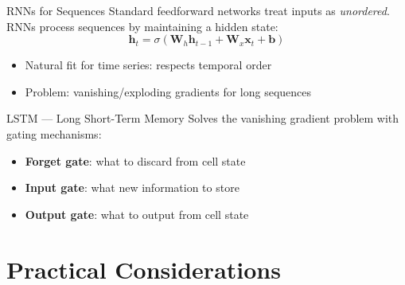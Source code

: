 \documentclass[aspectratio=169, 10pt]{beamer}
\begin{document}
\begin{frame}{RNNs for Sequences}
Standard feedforward networks treat inputs as \emph{unordered}. \\
RNNs process sequences by maintaining a \alert{hidden state}:
\[
\mathbf{h}_t = \sigma(\mathbf{W}_h \mathbf{h}_{t-1} + \mathbf{W}_x \mathbf{x}_t + \mathbf{b})
\]

\begin{itemize}
    \item Natural fit for time series: respects temporal order
    \item \alert{Problem:} vanishing/exploding gradients for long sequences
\end{itemize}
\end{frame}

\begin{frame}{LSTM --- Long Short-Term Memory}
Solves the vanishing gradient problem with \alert{gating mechanisms}:
\begin{itemize}
    \item \textbf{Forget gate}: what to discard from cell state
    \item \textbf{Input gate}: what new information to store
    \item \textbf{Output gate}: what to output from cell state
\end{itemize}

\vspace{0.5em}
\end{frame}

\section{Practical Considerations}
\end{document}
